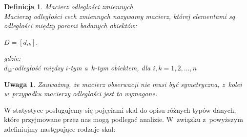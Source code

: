 \documentclass[12pt,a4paper]{report}
\newtheorem{definition}[theorem]{Definicja}
\newtheorem{uwaga}{Uwaga}
\begin{document}
\begin{definition}{Macierz odległości zmiennych \cite[Rozdział 1.6]{panek2013}}\\
Macierzą odległości cech zmiennych nazywamy macierz, której elementami są odległości między parami badanych obiektów: 
\begin{center}
$D = [d_{ik}].$
\end{center}
gdzie:\\
$d_{ik}$-odległość między $i$-tym a~$k$-tym obiektem, dla $i,k=1,2,\ldots,n$
\end{definition}

\begin{uwaga}
Zauważmy, że macierz obserwacji nie musi być symetryczna, z~kolei w~przypadku macierzy odległości jest to wymagane.
\end{uwaga}

W statystyce posługujemy się pojęciami skal do opisu różnych typów danych, które przyjmowane przez nas mogą podlegać analizie. W~związku z~powyższym zdefiniujmy następujące rodzaje skal:
\end{document}
